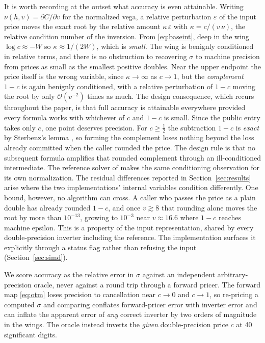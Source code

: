 \documentclass[11pt]{article}
\begin{document}
It is worth recording at the outset what accuracy is even attainable. Writing $\nu(h,v)=\partial C/\partial v$ for the normalized vega, a relative perturbation $\varepsilon$ of the input price moves the exact root by the relative amount $\kappa\,\varepsilon$ with $\kappa=c/(v\,\nu)$, the relative condition number of the inversion. From \eqref{eq:baseint}, deep in the wing $\log c\approx-W$ so $\kappa\approx1/(2W)$, which is \emph{small}. The wing is benignly conditioned in relative terms, and there is no obstruction to recovering $\sigma$ to machine precision from prices as small as the smallest positive doubles. Near the upper endpoint the price itself is the wrong variable, since $\kappa\to\infty$ as $c\to1$, but the \emph{complement} $1-c$ is again benignly conditioned, with a relative perturbation of $1-c$ moving the root by only $\mathcal{O}(v^{-2})$ times as much. The design consequence, which recurs throughout the paper, is that full accuracy is attainable everywhere provided every formula works with whichever of $c$ and $1-c$ is small. Since the public entry takes only $c$, one point deserves precision. For $c\ge\tfrac12$ the subtraction $1-c$ is \emph{exact} by Sterbenz's lemma \citep{muller2018handbook}, so forming the complement loses nothing beyond the loss already committed when the caller rounded the price. The design rule is that no subsequent formula amplifies that rounded complement through an ill-conditioned intermediate. The reference solver of \citet{jackel2015rational} makes the same conditioning observation for its own normalization. The residual differences reported in Section~\ref{sec:results} arise where the two implementations' internal variables condition differently. One bound, however, no algorithm can cross. A caller who passes the price as a plain double has already rounded $1-c$, and once $v\gtrsim8$ that rounding alone moves the root by more than $10^{-13}$, growing to $10^{-3}$ near $v\approx16.6$ where $1-c$ reaches machine epsilon. This is a property of the input representation, shared by every double-precision inverter including the reference. The implementation surfaces it explicitly through a status flag rather than refusing the input (Section~\ref{sec:simd}).

We score accuracy as the relative error in $\sigma$ against an independent arbitrary-precision oracle, never against a round trip through a forward pricer. The forward map \eqref{eq:otm} loses precision to cancellation near $c\to0$ and $c\to1$, so re-pricing a computed $\sigma$ and comparing conflates forward-pricer error with inverter error and can inflate the apparent error of \emph{any} correct inverter by two orders of magnitude in the wings. The oracle instead inverts the \emph{given} double-precision price $c$ at 40 significant digits.
\end{document}

